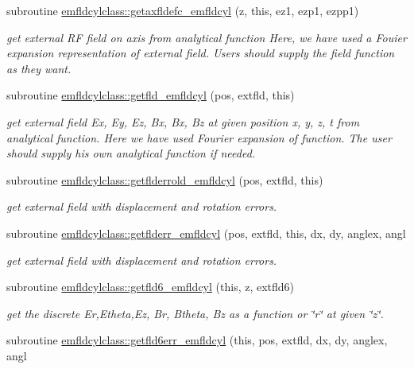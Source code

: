 \begin{DoxyCompactItemize}
subroutine \mbox{\hyperlink{namespaceemfldcylclass_a6e60352b9a6d8b289d85b9ddcc2b9336}{emfldcylclass\+::getaxfldefc\+\_\+emfldcyl}} (z, this, ez1, ezp1, ezpp1)
\begin{DoxyCompactList}\small\item\em get external RF field on axis from analytical function Here, we have used a Fouier expansion representation of external field. Users should supply the field function as they want. \end{DoxyCompactList}\item 
subroutine \mbox{\hyperlink{namespaceemfldcylclass_a521fd72bfe439ce6611678e767ee9263}{emfldcylclass\+::getfld\+\_\+emfldcyl}} (pos, extfld, this)
\begin{DoxyCompactList}\small\item\em get external field Ex, Ey, Ez, Bx, Bx, Bz at given position x, y, z, t from analytical function. Here we have used Fourier expansion of function. The user should supply his own analytical function if needed. \end{DoxyCompactList}\item 
subroutine \mbox{\hyperlink{namespaceemfldcylclass_a413e910d3137ed962527e2738f50e528}{emfldcylclass\+::getflderrold\+\_\+emfldcyl}} (pos, extfld, this)
\begin{DoxyCompactList}\small\item\em get external field with displacement and rotation errors. \end{DoxyCompactList}\item 
subroutine \mbox{\hyperlink{namespaceemfldcylclass_a2527e326fcd93dd1a661712a4c591de1}{emfldcylclass\+::getflderr\+\_\+emfldcyl}} (pos, extfld, this, dx, dy, anglex, angl
\begin{DoxyCompactList}\small\item\em get external field with displacement and rotation errors. \end{DoxyCompactList}\item 
subroutine \mbox{\hyperlink{namespaceemfldcylclass_ace5420817acc583fa855b546b70f6a5e}{emfldcylclass\+::getfld6\+\_\+emfldcyl}} (this, z, extfld6)
\begin{DoxyCompactList}\small\item\em get the discrete Er,Etheta,Ez, Br, Btheta, Bz as a function or \char`\"{}r\char`\"{} at given \char`\"{}z\char`\"{}. \end{DoxyCompactList}\item 
subroutine \mbox{\hyperlink{namespaceemfldcylclass_a4285c0422f781555210bb16c345c3e23}{emfldcylclass\+::getfld6err\+\_\+emfldcyl}} (this, pos, extfld, dx, dy, anglex, angl

\end{DoxyCompactItemize}

